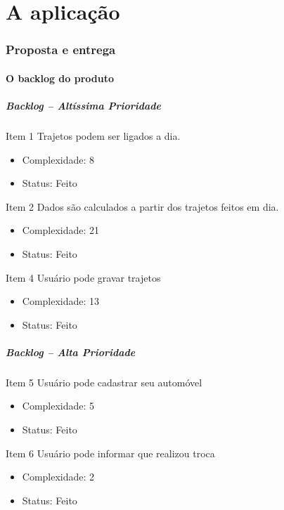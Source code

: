 \documentclass[hyperref={pdfpagelabels=false},11pt]{beamer}
\begin{document}
	\part{A aplicação}
		\section{Proposta e entrega}
			\subsection{O backlog do produto}
				\begin{frame}
					\frametitle{Backlog -- Altíssima Prioridade}
					\begin{block}{Item 1}
						Trajetos podem ser ligados a dia.
						\begin{itemize}
							\item{Complexidade: 8}
							\item{Status: Feito}
						\end{itemize}
					\end{block}
					
					\begin{block}{Item 2}
						Dados são calculados a partir dos trajetos feitos em dia.
						\begin{itemize}
							\item{Complexidade: 21}
							\item{Status: Feito}
						\end{itemize}
					\end{block}
				
				\begin{block}{Item 4}
					Usuário pode gravar trajetos
					\begin{itemize}
						\item{Complexidade: 13}
						\item{Status: Feito}
					\end{itemize}
				\end{block}
			\end{frame}
			
			\begin{frame}
				\frametitle{Backlog -- Alta Prioridade}
				\begin{block}{Item 5}
					Usuário pode cadastrar seu automóvel
					\begin{itemize}
						\item{Complexidade: 5}
						\item{Status: Feito}
					\end{itemize}
				\end{block}
				
				\begin{block}{Item 6}
					Usuário pode informar que realizou troca
					\begin{itemize}
						\item{Complexidade: 2}
						\item{Status: Feito}
					\end{itemize}
				\end{block}
			\end{frame}
			
\end{document}
